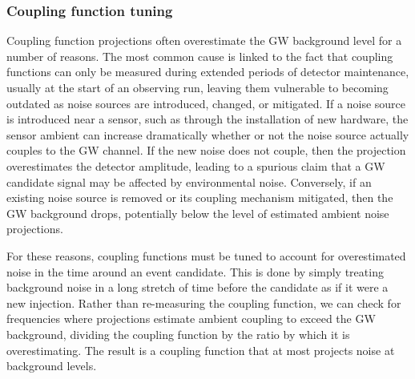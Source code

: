 \subsubsection{Coupling function tuning}

Coupling function projections often overestimate the \ac{GW} background level for a number of reasons.
The most common cause is linked to the fact that coupling functions can only be measured during extended periods of detector maintenance, usually at the start of an observing run, leaving them vulnerable to becoming outdated as noise sources are introduced, changed, or mitigated.
If a noise source is introduced near a sensor, such as through the installation of new hardware, the sensor ambient can increase dramatically whether or not the noise source actually couples to the \ac{GW} channel.
If the new noise does not couple, then the projection overestimates the detector amplitude, leading to a spurious claim that a \ac{GW} candidate signal may be affected by environmental noise.
Conversely, if an existing noise source is removed or its coupling mechanism mitigated, then the \ac{GW} background drops, potentially below the level of estimated ambient noise projections.

For these reasons, coupling functions must be tuned to account for overestimated noise in the time around an event candidate.
This is done by simply treating background noise in a long stretch of time before the candidate as if it were a new injection.
Rather than re-measuring the coupling function, we can check for frequencies where projections estimate ambient coupling to exceed the \ac{GW} background, dividing the coupling function by the ratio by which it is overestimating.
The result is a coupling function that at most projects noise at background levels.

